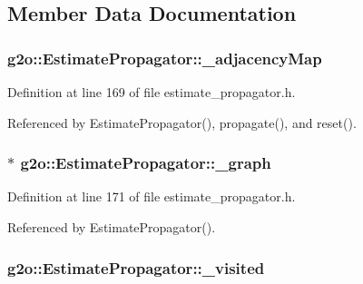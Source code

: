\subsection{Member Data Documentation}
\subsubsection[{\texorpdfstring{\+\_\+adjacency\+Map}{_adjacencyMap}}]{ g2o\+::\+Estimate\+Propagator\+::\+\_\+adjacency\+Map\hspace{0.3cm}{\ttfamily [protected]}}\hypertarget{classg2o_1_1EstimatePropagator_ac3f6429938db62696444fd7ee765439a}{}\label{classg2o_1_1EstimatePropagator_ac3f6429938db62696444fd7ee765439a}


Definition at line 169 of file estimate\+\_\+propagator.\+h.



Referenced by Estimate\+Propagator(), propagate(), and reset().

\subsubsection[{\texorpdfstring{\+\_\+graph}{_graph}}]{$\ast$ g2o\+::\+Estimate\+Propagator\+::\+\_\+graph\hspace{0.3cm}{\ttfamily [protected]}}\hypertarget{classg2o_1_1EstimatePropagator_ac2dcd3169696692ce3f0679235933e8a}{}\label{classg2o_1_1EstimatePropagator_ac2dcd3169696692ce3f0679235933e8a}


Definition at line 171 of file estimate\+\_\+propagator.\+h.



Referenced by Estimate\+Propagator().

\subsubsection[{\texorpdfstring{\+\_\+visited}{_visited}}]{ g2o\+::\+Estimate\+Propagator\+::\+\_\+visited\hspace{0.3cm}{\ttfamily [protected]}}\hypertarget{classg2o_1_1EstimatePropagator_a1256927d6d1832ee300daa53d1c845a2}{}\label{classg2o_1_1EstimatePropagator_a1256927d6d1832ee300daa53d1c845a2}


